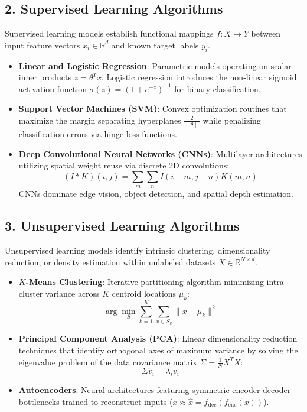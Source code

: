 \subsection{2. Supervised Learning Algorithms}
Supervised learning models establish functional mappings $f: X \to Y$ between input feature vectors $x_i \in \mathbb{R}^d$ and known target labels $y_i$.
\begin{itemize}[leftmargin=*]
    \item \textbf{Linear and Logistic Regression}: Parametric models operating on scalar inner products $z = \theta^T x$. Logistic regression introduces the non-linear sigmoid activation function $\sigma(z) = (1 + e^{-z})^{-1}$ for binary classification.
    \item \textbf{Support Vector Machines (SVM)}: Convex optimization routines that maximize the margin separating hyperplanes $\frac{2}{\|\theta\|}$ while penalizing classification errors via hinge loss functions.
    \item \textbf{Deep Convolutional Neural Networks (CNNs)}: Multilayer architectures utilizing spatial weight reuse via discrete 2D convolutions:
    \begin{equation}
    (I * K)(i, j) = \sum_{m} \sum_{n} I(i-m, j-n) K(m, n)
    \end{equation}
    CNNs dominate edge vision, object detection, and spatial depth estimation.
\end{itemize}

\subsection{3. Unsupervised Learning Algorithms}
Unsupervised learning models identify intrinsic clustering, dimensionality reduction, or density estimation within unlabeled datasets $X \in \mathbb{R}^{N \times d}$.
\begin{itemize}[leftmargin=*]
    \item \textbf{$K$-Means Clustering}: Iterative partitioning algorithm minimizing intra-cluster variance across $K$ centroid locations $\mu_k$:
    \begin{equation}
    \arg\min_{S} \sum_{k=1}^K \sum_{x \in S_k} \|x - \mu_k\|^2
    \end{equation}
    \item \textbf{Principal Component Analysis (PCA)}: Linear dimensionality reduction techniques that identify orthogonal axes of maximum variance by solving the eigenvalue problem of the data covariance matrix $\Sigma = \frac{1}{N} X^T X$:
    \begin{equation}
    \Sigma v_i = \lambda_i v_i
    \end{equation}
    \item \textbf{Autoencoders}: Neural architectures featuring symmetric encoder-decoder bottlenecks trained to reconstruct inputs ($x \approx \hat{x} = f_{\text{dec}}(f_{\text{enc}}(x))$).
\end{itemize}

